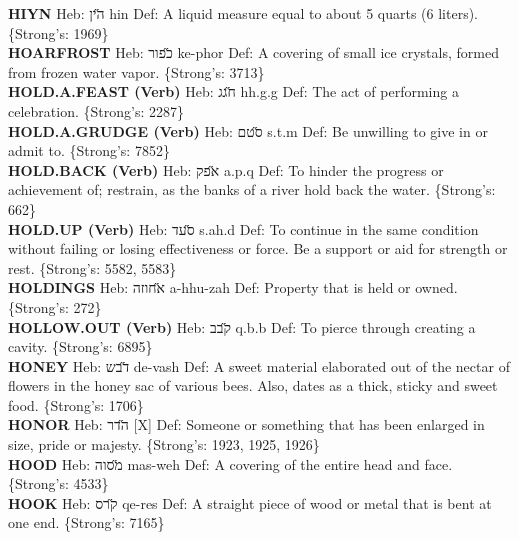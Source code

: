 {\textbf{HIYN} Heb: {\large\H הין} hin Def: A liquid measure equal to about 5 quarts (6 liters). \{Strong's: 1969\}\hfill{}\\

\textbf{HOARFROST} Heb: {\large\H כפור} ke-phor Def: A covering of small ice crystals, formed from frozen water vapor. \{Strong's: 3713\}\hfill{}\\

\textbf{HOLD.A.FEAST (Verb)} Heb: {\large\H חגג} hh.g.g Def: The act of performing a celebration. \{Strong's: 2287\}\hfill{}\\

\textbf{HOLD.A.GRUDGE (Verb)} Heb: {\large\H סטם} s.t.m Def: Be unwilling to give in or admit to. \{Strong's: 7852\}\hfill{}\\

\textbf{HOLD.BACK (Verb)} Heb: {\large\H אפק} a.p.q Def: To hinder the progress or achievement of; restrain, as the banks of a river hold back the water. \{Strong's: 662\}\hfill{}\\

\textbf{HOLD.UP (Verb)} Heb: {\large\H סעד} s.ah.d Def: To continue in the same condition without failing or losing effectiveness or force. Be a support or aid for strength or rest. \{Strong's: 5582, 5583\}\hfill{}\\

\textbf{HOLDINGS} Heb: {\large\H אחוזה} a-hhu-zah Def: Property that is held or owned. \{Strong's: 272\}\hfill{}\\

\textbf{HOLLOW.OUT (Verb)} Heb: {\large\H קבב} q.b.b Def: To pierce through creating a cavity. \{Strong's: 6895\}\hfill{}\\

\textbf{HONEY} Heb: {\large\H דבש} de-vash Def: A sweet material elaborated out of the nectar of flowers in the honey sac of various bees. Also, dates as a thick, sticky and sweet food. \{Strong's: 1706\}\hfill{}\\

\textbf{HONOR} Heb: {\large\H הדר} {[}X{]} Def: Someone or something that has been enlarged in size, pride or majesty. \{Strong's: 1923, 1925, 1926\}\hfill{}\\

\textbf{HOOD} Heb: {\large\H מסוה} mas-weh Def: A covering of the entire head and face. \{Strong's: 4533\}\hfill{}\\

\textbf{HOOK} Heb: {\large\H קרס} qe-res Def: A straight piece of wood or metal that is bent at one end. \{Strong's: 7165\}\hfill{}\\

}
